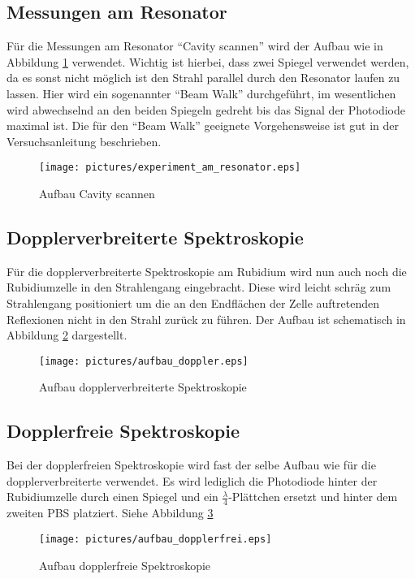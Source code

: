 \documentclass[12pt]{article}
\begin{document}
\subsection{Messungen am Resonator}
Für die Messungen am Resonator ``Cavity scannen'' wird der Aufbau wie in Abbildung \ref{skizze-cavity} verwendet. Wichtig ist hierbei, dass zwei Spiegel verwendet werden, da es sonst nicht möglich ist den Strahl parallel durch den Resonator laufen zu lassen. Hier wird ein sogenannter ``Beam Walk'' durchgeführt, im wesentlichen wird abwechselnd an den beiden Spiegeln gedreht bis das Signal der Photodiode maximal ist. Die für den ``Beam Walk'' geeignete Vorgehensweise ist gut in der Versuchsanleitung beschrieben.
\begin{figure}[H]
 \texttt{[image: pictures/experiment\_am\_resonator.eps]}
 \caption{Aufbau Cavity scannen}
 \label{skizze-cavity}
\end{figure}
\newpage
\subsection{Dopplerverbreiterte Spektroskopie}
Für die dopplerverbreiterte Spektroskopie am Rubidium wird nun auch noch die Rubidiumzelle in den Strahlengang eingebracht.
Diese wird leicht schräg zum Strahlengang positioniert um die an den Endflächen der Zelle auftretenden Reflexionen nicht in den Strahl zurück zu führen. Der Aufbau ist schematisch in Abbildung \ref{skizze-dopplerbreit} dargestellt.
\begin{figure}[H]
 \texttt{[image: pictures/aufbau\_doppler.eps]}
 \caption{Aufbau dopplerverbreiterte Spektroskopie}
 \label{skizze-dopplerbreit}
\end{figure}
\newpage
\subsection{Dopplerfreie Spektroskopie}
Bei der dopplerfreien Spektroskopie wird fast der selbe Aufbau wie für die dopplerverbreiterte verwendet. Es wird lediglich die Photodiode hinter der Rubidiumzelle durch einen Spiegel und ein $\frac{\lambda}{4}$-Plättchen ersetzt und hinter dem zweiten PBS platziert. Siehe Abbildung \ref{skizze-dopplerfrei}
\begin{figure}[H]
 \texttt{[image: pictures/aufbau\_dopplerfrei.eps]}
 \caption{Aufbau dopplerfreie Spektroskopie}
 \label{skizze-dopplerfrei}
\end{figure}
\newpage
\end{document}
